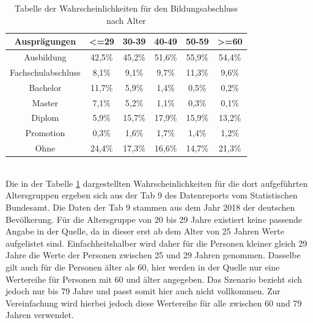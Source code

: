 \begin{onehalfspace}
\begin{table}[!h]
    \centering
    \begin{tabular}{|c|c|c|c|c|c|}
    \hline
    \textbf{Ausprägungen} & \textbf{\textless{}=29} & \textbf{30-39} & \textbf{40-49} & \textbf{50-59} & \textbf{\textgreater{}=60} \\ \hline
    Ausbildung            & 42,5\%                  & 45,2\%         & 51,6\%         & 55,9\%         & 54,4\%                     \\ \hline
    Fachschulabschluss    & 8,1\%                   & 9,1\%          & 9,7\%          & 11,3\%         & 9,6\%                      \\ \hline
    Bachelor              & 11,7\%                  & 5,9\%          & 1,4\%          & 0,5\%          & 0,2\%                      \\ \hline
    Master                & 7,1\%                   & 5,2\%          & 1,1\%          & 0,3\%          & 0,1\%                      \\ \hline
    Diplom                & 5,9\%                   & 15,7\%         & 17,9\%         & 15,9\%         & 13,2\%                     \\ \hline
    Promotion             & 0,3\%                   & 1,6\%          & 1,7\%          & 1,4\%          & 1,2\%                      \\ \hline
    Ohne                  & 24,4\%                  & 17,3\%         & 16,6\%         & 14,7\%         & 21,3\%                     \\ \hline
    \end{tabular}
    \caption{Tabelle der Wahrscheinlichkeiten für den Bildungsabschluss nach Alter}
    \label{table:8}
\end{table}\\
Die in der Tabelle \ref{table:8} dargestellten Wahrscheinlichkeiten für die dort aufgeführten Altersgruppen ergeben sich aus der \glqq{}Tab 9\grqq{} des Datenreports vom Statistischen Bundesamt. Die Daten der \glqq{}Tab 9\grqq{} stammen aus dem Jahr 2018 der deutschen Bevölkerung. Für die Altersgruppe von 20 bis 29 Jahre existiert keine passende Angabe in der Quelle, da in dieser erst ab dem Alter von 25 Jahren Werte aufgelistet sind. Einfachheitshalber wird daher für die Personen kleiner gleich 29 Jahre die Werte der Personen zwischen 25 und 29 Jahren genommen. Dasselbe gilt auch für die Personen älter als 60, hier werden in der Quelle nur eine Wertereihe für Personen mit 60 und älter angegeben. Das Szenario bezieht sich jedoch nur bis 79 Jahre und passt somit hier auch nicht vollkommen. Zur Vereinfachung wird hierbei jedoch diese Wertereihe für alle zwischen 60 und 79 Jahren verwendet.\cite{destatis2021}\\

\end{onehalfspace}
